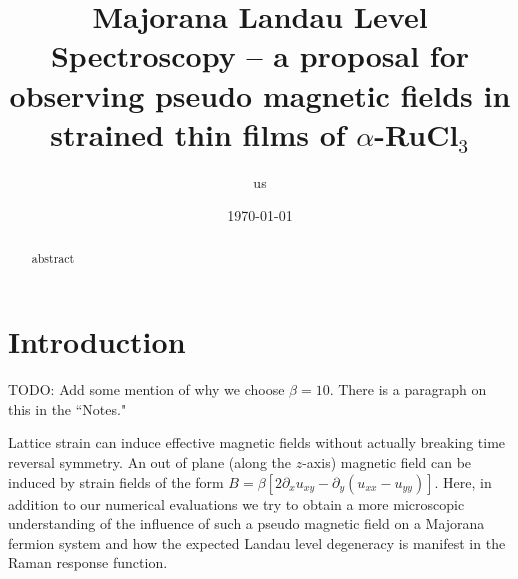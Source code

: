 \documentclass[reprint,amsmath,amssymb,aps,prl,groupedaddress,nofootinbib,superscriptaddress]{revtex4-1}
\newcommand{\1}{\mathds{1}}
\newcommand{\fb}{\it \color{orange}}
\newcommand{\bp}{ \color{straw} }
\newcommand{\jk}{\it \color{darkgreen}}
\begin{document}
	
	
	
	\title{Majorana Landau Level Spectroscopy  --  a proposal for observing pseudo magnetic fields in  strained thin films of $\alpha$-RuCl$_3$}
		\author{us}
		
		\date{\today} 
		
		
		\begin{abstract}
		 	abstract
		\end{abstract}
		
		
		
		\maketitle
		
		
		
	
	
	\section{Introduction}
	
{\bp	TODO: Add some mention of why we choose $\beta = 10$. There is a paragraph on this in the ``Notes." }
	
Lattice strain can induce effective magnetic fields without actually breaking time reversal symmetry. An out of plane (along the $z$-axis) magnetic field can be induced by strain fields of the form $B=\beta \left[2 \partial_x u_{xy}-\partial_y (u_{xx}-u_{yy}) \right]$. Here, in addition to our numerical evaluations we try to obtain a more microscopic understanding of the influence of such a pseudo magnetic field on a Majorana fermion system and how the expected Landau level degeneracy is manifest in the Raman response function. 
\end{document}

